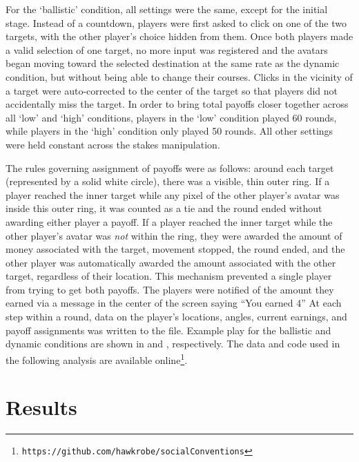\documentclass[10pt,letterpaper]{article}
\begin{document}
For the `ballistic' condition, all settings were the same, except for the initial stage. Instead of a countdown, players were first asked to click on one of the two targets, with the other player's choice hidden from them. Once both players made a valid selection of one target, no more input was registered and the avatars began moving toward the selected destination at the same rate as the dynamic condition, but without being able to change their courses. Clicks in the vicinity of a target were auto-corrected to the center of the target so that players did not accidentally miss the target. In order to bring total payoffs closer together across all `low' and `high' conditions, players in the `low' condition played 60 rounds, while players in the `high' condition only played 50 rounds. All other settings were held constant across the stakes manipulation. 

The rules governing assignment of payoffs were as follows: around each target (represented by a solid white circle), there was a visible, thin outer ring. If a player reached the inner target while any pixel of the other player's avatar was inside this outer ring, it was counted as a tie and the round ended without awarding either player a payoff. If a player reached the inner target while the other player's avatar was \emph{not} within the ring, they were awarded the amount of money associated with the target, movement stopped, the round ended, and the other player was automatically awarded the amount associated with the other target, regardless of their location. This mechanism prevented a single player from trying to get both payoffs. The players were notified of the amount they earned via a message in the center of the screen saying ``You earned 4\textcent [2\textcent]'' At each step within a round, data on the player's locations, angles, current earnings, and payoff assignments was written to the file. Example play for the ballistic and dynamic conditions are shown in  and , respectively. The data and code used in the following analysis are available online\footnote{\texttt{https://github.com/hawkrobe/socialConventions}}.

\section*{Results}
\end{document}
